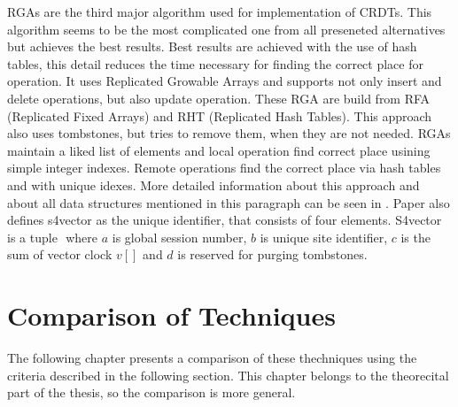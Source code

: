 \documentclass[12pt,oneside]{fithesis2}
\begin{document}
\par RGAs are the third major algorithm used for implementation of CRDTs. This algorithm seems to be the most complicated one from all preseneted alternatives but achieves the best results. Best results are achieved with the use of hash tables, this detail reduces the time necessary for finding the correct place for operation.  It uses Replicated Growable Arrays and supports not only insert and delete operations, but also update operation. These RGA are build from RFA (Replicated Fixed Arrays) and RHT (Replicated Hash Tables). This approach also uses tombstones, but tries to remove them, when they are not needed. RGAs maintain a liked list of elements and local operation find correct place usining simple integer indexes. Remote operations find the correct place via hash tables and with unique idexes. More detailed information about this approach and about all data structures mentioned in this paragraph can be seen in \cite{RGA}. Paper also defines s4vector as the unique identifier, that consists of four elements. S4vector is a tuple \(<a,b,c,d>\) where \(a\) is global session number, \(b\) is unique site identifier, \(c\) is the sum of vector clock \(v[]\) and \(d\) is reserved for purging tombstones. 
\chapter{Comparison of Techniques}
The following chapter  presents a comparison of these thechniques using the criteria described in the following section. This chapter belongs to the theorecital part of the thesis, so the comparison is more general. 
\end{document}

